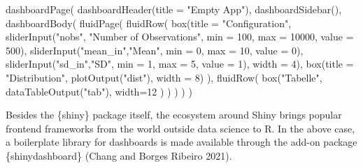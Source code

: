 \documentclass[
  12pt,
  letterpaper,
]{krantz}
\newenvironment{Shaded}{\begin{snugshade}}{\end{snugshade}}
\newcommand{\AttributeTok}[1]{\textcolor[rgb]{0.40,0.45,0.13}{#1}}
\newcommand{\DecValTok}[1]{\textcolor[rgb]{0.68,0.00,0.00}{#1}}
\newcommand{\FunctionTok}[1]{\textcolor[rgb]{0.28,0.35,0.67}{#1}}
\newcommand{\NormalTok}[1]{\textcolor[rgb]{0.00,0.23,0.31}{#1}}
\newcommand{\StringTok}[1]{\textcolor[rgb]{0.13,0.47,0.30}{#1}}
\begin{document}
\begin{Shaded}
\begin{Highlighting}[]
\FunctionTok{dashboardPage}\NormalTok{(}
  \FunctionTok{dashboardHeader}\NormalTok{(}\AttributeTok{title =} \StringTok{"Empty App"}\NormalTok{),}
  \FunctionTok{dashboardSidebar}\NormalTok{(),}
  \FunctionTok{dashboardBody}\NormalTok{(}
    \FunctionTok{fluidPage}\NormalTok{(}
      \FunctionTok{fluidRow}\NormalTok{(}
        \FunctionTok{box}\NormalTok{(}\AttributeTok{title =} \StringTok{"Configuration"}\NormalTok{,}
            \FunctionTok{sliderInput}\NormalTok{(}\StringTok{"nobs"}\NormalTok{,}
                        \StringTok{"Number of Observations"}\NormalTok{,}
                        \AttributeTok{min =} \DecValTok{100}\NormalTok{,}
                        \AttributeTok{max =} \DecValTok{10000}\NormalTok{,}
                        \AttributeTok{value =} \DecValTok{500}\NormalTok{),}
            \FunctionTok{sliderInput}\NormalTok{(}\StringTok{"mean\_in"}\NormalTok{,}\StringTok{"Mean"}\NormalTok{,}
                        \AttributeTok{min =} \DecValTok{0}\NormalTok{,}
                        \AttributeTok{max =} \DecValTok{10}\NormalTok{,}
                        \AttributeTok{value =} \DecValTok{0}\NormalTok{),}
            \FunctionTok{sliderInput}\NormalTok{(}\StringTok{"sd\_in"}\NormalTok{,}\StringTok{"SD"}\NormalTok{,}
                        \AttributeTok{min =} \DecValTok{1}\NormalTok{,}
                        \AttributeTok{max =} \DecValTok{5}\NormalTok{,}
                        \AttributeTok{value =} \DecValTok{1}\NormalTok{),}
            \AttributeTok{width =} \DecValTok{4}\NormalTok{),}
        \FunctionTok{box}\NormalTok{(}\AttributeTok{title =} \StringTok{"Distribution"}\NormalTok{,}
            \FunctionTok{plotOutput}\NormalTok{(}\StringTok{"dist"}\NormalTok{),}
            \AttributeTok{width =} \DecValTok{8}\NormalTok{)}
\NormalTok{      ),}
      \FunctionTok{fluidRow}\NormalTok{(}
        \FunctionTok{box}\NormalTok{(}\StringTok{"Tabelle"}\NormalTok{,}
            \FunctionTok{dataTableOutput}\NormalTok{(}\StringTok{"tab"}\NormalTok{),}
            \AttributeTok{width=}\DecValTok{12}
\NormalTok{            )}
\NormalTok{      )}
\NormalTok{    )}
\NormalTok{  )}
\NormalTok{)}
\end{Highlighting}
\end{Shaded}

Besides the \{shiny\} package itself, the ecosystem around
Shiny brings popular frontend frameworks from the world outside data
science to R. In the above case, a boilerplate library for dashboards is
made available through the add-on package \{shinydashboard\} (Chang and
Borges Ribeiro 2021).
\end{document}
